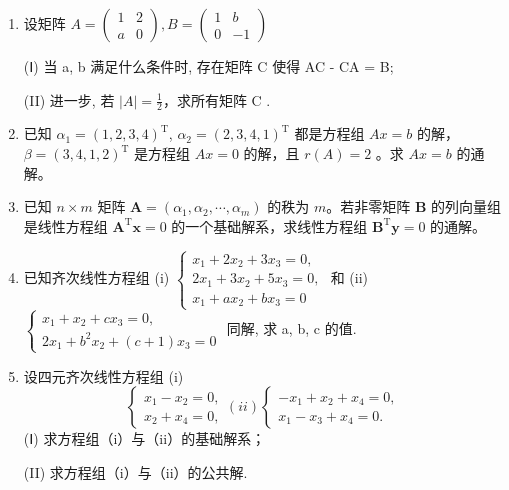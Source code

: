 \documentclass[12pt, a4paper]{ctexart}
\begin{document}
\begin{enumerate}[start=14]
    \item 设矩阵 $ A=\begin{pmatrix}1&2\\ a&0\end{pmatrix},B=\begin{pmatrix}1&b\\ 0&-1\end{pmatrix} $
    
    (Ⅰ) 当 a, b 满足什么条件时, 存在矩阵 C 使得 AC - CA = B;
    
    (II) 进一步, 若 $ \left|A\right|=\frac{1}{2} $，求所有矩阵 C .

    \item 已知 $ \alpha_1 = (1, 2, 3, 4)^\mathrm{T} $, $ \alpha_2 = (2, 3, 4, 1)^\mathrm{T} $ 都是方程组 $ Ax = b $ 的解， $ \beta = (3, 4, 1, 2)^\mathrm{T} $ 是方程组 $ Ax = 0 $ 的解，且 $ r(A) = 2 $ 。求 $ Ax = b $ 的通解。

    \item 已知 $ n \times m $ 矩阵 $ \mathbf{A} = (\alpha_1, \alpha_2, \cdots, \alpha_m) $ 的秩为 $ m $。若非零矩阵 $ \mathbf{B} $ 的列向量组是线性方程组 $ \mathbf{A}^{\mathrm{T}} \mathbf{x} = 0 $ 的一个基础解系，求线性方程组 $ \mathbf{B}^{\mathrm{T}} \mathbf{y} = 0 $ 的通解。

    \item 已知齐次线性方程组 (i) $ \begin{cases} x_{1} + 2x_{2} + 3x_{3} = 0, \\ 2x_{1} + 3x_{2} + 5x_{3} = 0, \\ x_{1} + ax_{2} + bx_{3} = 0 \end{cases} $ 和 (ii) $ \begin{cases} x_{1} + x_{2} + cx_{3} = 0, \\ 2x_{1} + b^{2}x_{2} + (c + 1)x_{3} = 0 \end{cases} $ 同解, 求 a, b, c 的值.

    \item 设四元齐次线性方程组
    (i)
    $$ \begin{cases}x_{1}-x_{2}=0,\\x_{2}+x_{4}=0,\end{cases}(ii)\begin{cases}-x_{1}+x_{2}+x_{4}=0,\\x_{1}-x_{3}+x_{4}=0.\end{cases} $$
    (Ⅰ) 求方程组（i）与（ii）的基础解系；
    
    (II) 求方程组（i）与（ii）的公共解.
\end{enumerate}
\end{document}
